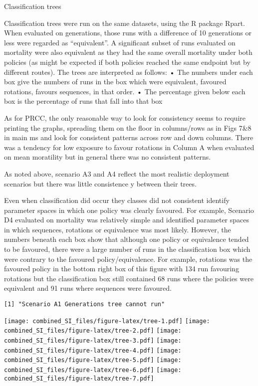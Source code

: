 \documentclass[
]{article}
\begin{document}
\pagebreak

Classification trees

Classification trees were run on the same datasets, using the R package
Rpart. When evaluated on generations, those runs with a difference of 10
generations or less were regarded as ``equivalent''. A significant
subset of runs evaluated on mortality were also equivalent as they had
the same overall mortality under both policies (as might be expected if
both policies reached the same endpoint but by different routes). The
trees are interpreted as follows: • The numbers under each box give the
numbers of runs in the box which were equivalent, favoured rotations,
favours sequences, in that order. • The percentage given below each box
is the percentage of runs that fall into that box

As for PRCC, the only reasonable way to look for consistency seems to
require printing the graphs, spreading them on the floor in columns/rows
as in Figs 7\&8 in main ms and look for consistent patterns across row
and down columns. There was a tendency for low exposure to favour
rotations in Column A when evaluated on mean moratility but in general
there was no consistent patterns.

As noted above, scenario A3 and A4 reflect the most realistic deployment
scenarios but there was little consistence y between their trees.

Even when classification did occur they classes did not consistent
identify parameter spaces in which one policy was clearly favoured. For
example, Scenario D4 evaluated on mortality was relatively simple and
identified parameter spaces in which sequences, rotations or equivalence
was most likely. However, the numbers beneath each box show that
although one policy or equivalence tended to be favoured, there were a
large number of runs in the classification box which were contrary to
the favoured policy/equivalence. For example, rotations was the favoured
policy in the bottom right box of this figure with 134 run favouring
rotations but the classification box still contained 68 runs where the
policies were equivalent and 91 runs where sequences were favoured.

\pagebreak

\begin{verbatim}
[1] "Scenario A1 Generations tree cannot run"
\end{verbatim}

\texttt{[image: combined\_SI\_files/figure-latex/tree-1.pdf]}
\texttt{[image: combined\_SI\_files/figure-latex/tree-2.pdf]}
\texttt{[image: combined\_SI\_files/figure-latex/tree-3.pdf]}
\texttt{[image: combined\_SI\_files/figure-latex/tree-4.pdf]}
\texttt{[image: combined\_SI\_files/figure-latex/tree-5.pdf]}
\texttt{[image: combined\_SI\_files/figure-latex/tree-6.pdf]}
\texttt{[image: combined\_SI\_files/figure-latex/tree-7.pdf]}
\end{document}
